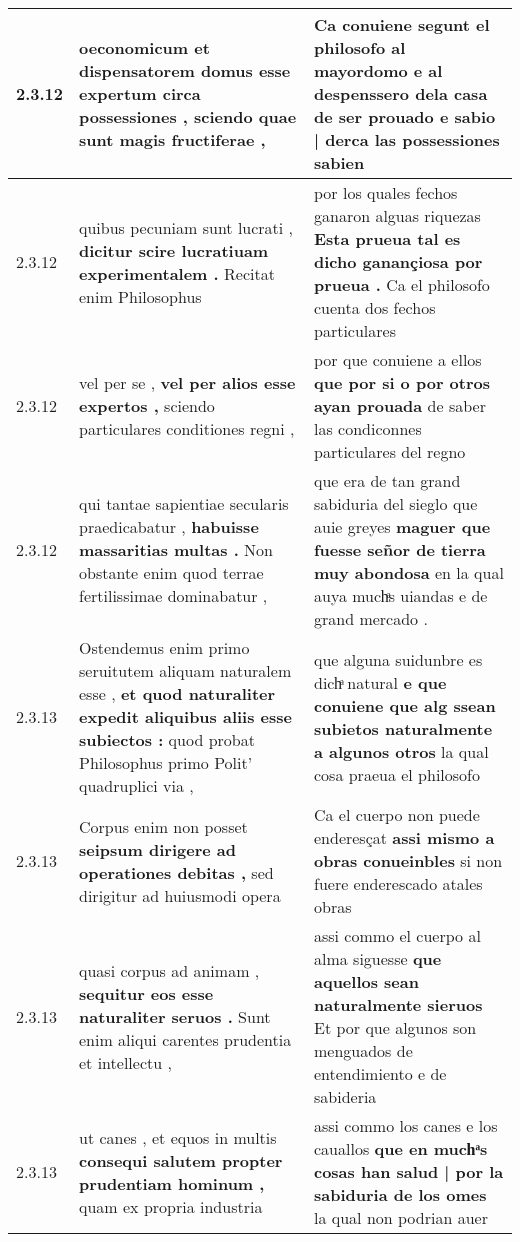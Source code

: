 \begin{tabular}{|p{1cm}|p{6.5cm}|p{6.5cm}|}
2.3.12 & oeconomicum et dispensatorem domus \textbf{ esse expertum circa possessiones , } sciendo quae sunt magis fructiferae , & Ca conuiene segunt el philosofo al mayordomo e al despenssero dela casa de ser prouado \textbf{ e sabio | derca las possessiones } sabien \\\hline
2.3.12 & quibus pecuniam sunt lucrati , \textbf{ dicitur scire lucratiuam experimentalem . } Recitat enim Philosophus & por los quales fechos ganaron alguas riquezas \textbf{ Esta prueua tal es dicho ganançiosa por prueua . } Ca el philosofo cuenta dos fechos particulares \\\hline
2.3.12 & vel per se , \textbf{ vel per alios esse expertos , } sciendo particulares conditiones regni , & por que conuiene a ellos \textbf{ que por si o por otros ayan prouada } de saber las condiconnes particulares del regno \\\hline
2.3.12 & qui tantae sapientiae secularis praedicabatur , \textbf{ habuisse massaritias multas . } Non obstante enim quod terrae fertilissimae dominabatur , & que era de tan grand sabiduria del sieglo que auie greyes \textbf{ maguer que fuesse señor de tierra muy abondosa } en la qual auya muchͣs uiandas e de grand mercado . \\\hline
2.3.13 & Ostendemus enim primo seruitutem aliquam naturalem esse , \textbf{ et quod naturaliter expedit aliquibus aliis esse subiectos : } quod probat Philosophus primo Polit’ quadruplici via , & que alguna suidunbre es dichͣ natural \textbf{ e que conuiene que alg ssean subietos naturalmente a algunos otros } la qual cosa praeua el philosofo \\\hline
2.3.13 & Corpus enim non posset \textbf{ seipsum dirigere ad operationes debitas , } sed dirigitur ad huiusmodi opera & Ca el cuerpo non puede enderesçat \textbf{ assi mismo a obras conueinbles } si non fuere enderescado atales obras \\\hline
2.3.13 & quasi corpus ad animam , \textbf{ sequitur eos esse naturaliter seruos . } Sunt enim aliqui carentes prudentia et intellectu , & assi commo el cuerpo al alma siguesse \textbf{ que aquellos sean naturalmente sieruos } Et por que algunos son menguados de entendimiento e de sabideria \\\hline
2.3.13 & ut canes , et equos in multis \textbf{ consequi salutem propter prudentiam hominum , } quam ex propria industria & assi commo los canes e los cauallos \textbf{ que en muchͣs cosas han salud | por la sabiduria de los omes } la qual non podrian auer \\\hline

\end{tabular}
